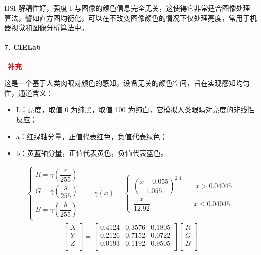 \documentclass{article}
\begin{document}
HSI 解耦性好，强度 I 与图像的颜色信息完全无关，这使得它非常适合图像处理算法，譬如直方图均衡化，可以在不改变图像颜色的情况下仅处理亮度，常用于机器视觉和图像分析算法中。

\paragraph*{7. CIELab}~{\bfseries\textcolor{red}{补充}}

这是一个基于人类肉眼对颜色的感知，设备无关的颜色空间，旨在实现感知均匀性，通道含义：

\begin{itemize}
    \item L：亮度，取值 0 为纯黑，取值 100 为纯白，它模拟人类眼睛对亮度的非线性反应；
    \item a：红绿轴分量，正值代表红色，负值代表绿色；
    \item b：黄蓝轴分量，正值代表黄色，负值代表蓝色。
\end{itemize}
\begin{align*}
    \begin{cases}
        R=\gamma\left(\dfrac{r}{255}\right)
        \\[10pt]
        G=\gamma\left(\dfrac{g}{255}\right)
        \\[10pt]
        B=\gamma\left(\dfrac{b}{255}\right)
    \end{cases}\qquad\gamma(x)=\begin{cases}
            \left(\dfrac{x+0.055}{1.055}\right)^{2.4}\qquad x>0.04045
            \\[10pt]
            \dfrac{x}{12.92}\qquad\qquad\qquad\ x\leqslant0.04045
        \end{cases}
\end{align*}
\begin{align*}
    \left[\begin{matrix}
        X \\
        Y \\
        Z \\
    \end{matrix}\right]=\left[\begin{matrix}
        0.4124 & 0.3576 & 0.1805 \\
        0.2126 & 0.7152 & 0.0722 \\
        0.0193 & 0.1192 & 0.9505 \\
    \end{matrix}\right]\left[\begin{matrix}
        R \\
        G \\
        B \\
    \end{matrix}\right]
\end{align*}
\end{document}
